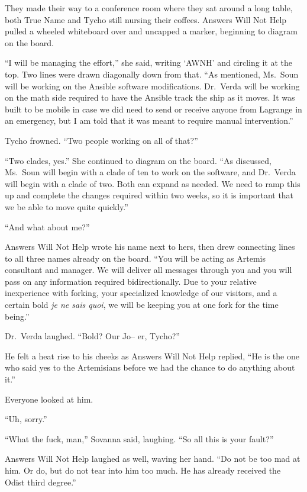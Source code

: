 They made their way to a conference room where they sat around a long table, both True Name and Tycho still nursing their coffees. Answers Will Not Help pulled a wheeled whiteboard over and uncapped a marker, beginning to diagram on the board.

``I will be managing the effort,'' she said, writing `AWNH' and circling it at the top. Two lines were drawn diagonally down from that. ``As mentioned, Ms.~Soun will be working on the Ansible software modifications. Dr.~Verda will be working on the math side required to have the Ansible track the ship as it moves. It was built to be mobile in case we did need to send or receive anyone from Lagrange in an emergency, but I am told that it was meant to require manual intervention.''

Tycho frowned. ``Two people working on all of that?''

``Two clades, yes.'' She continued to diagram on the board. ``As discussed, Ms.~Soun will begin with a clade of ten to work on the software, and Dr.~Verda will begin with a clade of two. Both can expand as needed. We need to ramp this up and complete the changes required within two weeks, so it is important that we be able to move quite quickly.''

``And what about me?''

Answers Will Not Help wrote his name next to hers, then drew connecting lines to all three names already on the board. ``You will be acting as Artemis consultant and manager. We will deliver all messages through you and you will pass on any information required bidirectionally. Due to your relative inexperience with forking, your specialized knowledge of our visitors, and a certain bold \emph{je ne sais quoi}, we will be keeping you at one fork for the time being.''

Dr.~Verda laughed. ``Bold? Our Jo-- er, Tycho?''

He felt a heat rise to his cheeks as Answers Will Not Help replied, ``He is the one who said yes to the Artemisians before we had the chance to do anything about it.''

Everyone looked at him.

``Uh, sorry.''

``What the fuck, man,'' Sovanna said, laughing. ``So all this is your fault?''

Answers Will Not Help laughed as well, waving her hand. ``Do not be too mad at him. Or do, but do not tear into him too much. He has already received the Odist third degree.''

